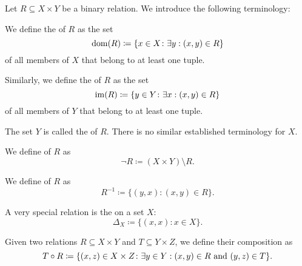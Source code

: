 \begin{definition}\label{def:binary_relation}
  Let \( R \subseteq X \times Y \) be a binary relation. We introduce the following terminology:
  \begin{defenum}[series=def:binary_relation]
     We define the  of \( R \) as the set
    \begin{equation*}
      \operatorname{dom}(R) \coloneqq \{ x \in X \colon \exists y: (x, y) \in R \}
    \end{equation*}
    of all members of \( X \) that belong to at least one tuple.

     Similarly, we define the  of \( R \) as the set
    \begin{equation*}
      \operatorname{im}(R) \coloneqq \{ y \in Y \colon \exists x: (x, y) \in R \}
    \end{equation*}
    of all members of \( Y \) that belong to at least one tuple.

     The set \( Y \) is called the  of \( R \). There is no similar established terminology for \( X \).

     We define  of \( R \) as
    \begin{equation*}
      \neg R \coloneqq (X \times Y) \setminus R.
    \end{equation*}

     We define  of \( R \) as
    \begin{equation*}
      R^{-1} \coloneqq \{ (y, x) \colon (x, y) \in R \}.
    \end{equation*}

     A very special relation is the  on a set \( X \):
    \begin{equation*}
      \Delta_X \coloneqq \{ (x, x) \colon x \in X \}.
    \end{equation*}

     Given two relations \( R \subseteq X \times Y \) and \( T \subseteq Y \times Z \), we define their composition as
    \begin{equation*}
      T \circ R \coloneqq \{ (x, z) \in X \times Z \colon \exists y \in Y: (x, y) \in R \text{ and } (y, z) \in T \}.
    \end{equation*}
  \end{defenum}


\end{definition}
